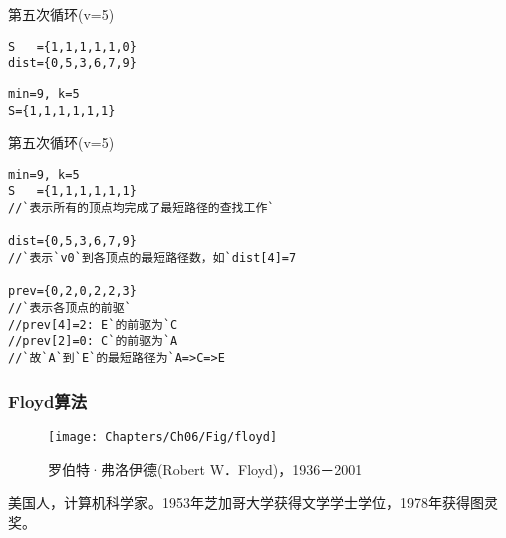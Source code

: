\begin{frame}[fragile]\ft{\subsubsecname}

\tf 第五次循环(v=5) 
\begin{lstlisting}
S   ={1,1,1,1,1,0}
dist={0,5,3,6,7,9}
\end{lstlisting}



\begin{lstlisting}
min=9, k=5
S={1,1,1,1,1,1}
\end{lstlisting}

\end{frame}

\begin{frame}[fragile]\ft{\subsubsecname}

\tf 第五次循环(v=5) 
\begin{lstlisting}
min=9, k=5
S   ={1,1,1,1,1,1}
//`表示所有的顶点均完成了最短路径的查找工作`

dist={0,5,3,6,7,9}
//`表示`v0`到各顶点的最短路径数，如`dist[4]=7

prev={0,2,0,2,2,3}
//`表示各顶点的前驱`
//prev[4]=2: E`的前驱为`C
//prev[2]=0: C`的前驱为`A
//`故`A`到`E`的最短路径为`A=>C=>E
\end{lstlisting}


\end{frame}



 
%
%
%


\subsubsection{\tf Floyd算法}


\begin{frame}\ft{\subsubsecname}
\begin{figure}
\centering
\texttt{[image: Chapters/Ch06/Fig/floyd]}
\caption{罗伯特·弗洛伊德(Robert W．Floyd)，1936－2001}
\end{figure}
美国人，计算机科学家。1953年芝加哥大学获得文学学士学位，1978年获得图灵奖。
\end{frame}




